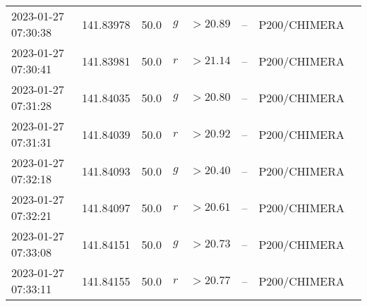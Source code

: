 \documentclass{nature_plusfigure}
\begin{document}
\begin{supplement}
\begin{center}
\begin{longtable}{llllllll}
2023-01-27 07:30:38 & 141.83978 & 50.0 & $g$ & $>20.89$ & -- & P200/CHIMERA &  \\ 
2023-01-27 07:30:41 & 141.83981 & 50.0 & $r$ & $>21.14$ & -- & P200/CHIMERA &  \\ 
2023-01-27 07:31:28 & 141.84035 & 50.0 & $g$ & $>20.80$ & -- & P200/CHIMERA &  \\ 
2023-01-27 07:31:31 & 141.84039 & 50.0 & $r$ & $>20.92$ & -- & P200/CHIMERA &  \\ 
2023-01-27 07:32:18 & 141.84093 & 50.0 & $g$ & $>20.40$ & -- & P200/CHIMERA &  \\ 
2023-01-27 07:32:21 & 141.84097 & 50.0 & $r$ & $>20.61$ & -- & P200/CHIMERA &  \\ 
2023-01-27 07:33:08 & 141.84151 & 50.0 & $g$ & $>20.73$ & -- & P200/CHIMERA &  \\ 
2023-01-27 07:33:11 & 141.84155 & 50.0 & $r$ & $>20.77$ & -- & P200/CHIMERA &  \\ 
\hline 
\end{longtable} 
\end{center} 


\clearpage


\end{supplement}
\end{document}
